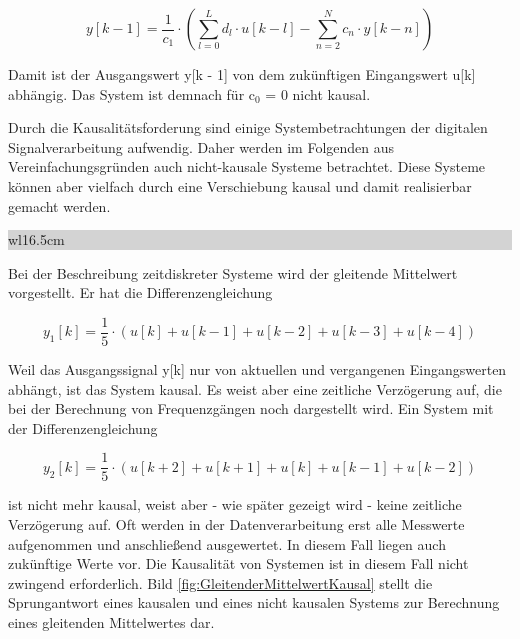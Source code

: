 \begin{equation}\label{eq:fourthirtyeight}
y\left[k-1\right]=\frac{1}{c_{1} } \cdot \left(\sum _{l=0}^{L}d_{l} \cdot u\left[k-l\right] -\sum _{n=2}^{N}c_{n} \cdot y\left[k-n\right] \right)
\end{equation}

\noindent Damit ist der Ausgangswert y[k - 1] von dem zuk\"{u}nftigen Eingangswert u[k] abh\"{a}ngig. Das System ist demnach f\"{u}r c${}_{0}$ = 0 nicht kausal.\bigskip 

\noindent Durch die Kausalit\"{a}tsforderung sind einige Systembetrachtungen der digitalen Signalverarbeitung aufwendig. Daher werden im Folgenden aus Vereinfachungsgr\"{u}nden auch nicht-kausale Systeme betrachtet. Diese Systeme k\"{o}nnen aber vielfach durch eine Verschiebung kausal und damit realisierbar gemacht werden.\bigskip

\noindent
\colorbox{lightgray}{%
%
\renewcommand\arraystretch{0.6}%
\begin{tabular}{ wl{16.5cm} }
{}
\end{tabular}%
}\medskip

\noindent Bei der Beschreibung zeitdiskreter Systeme wird der gleitende Mittelwert vorgestellt. Er hat die Differenzengleichung 

\begin{equation}\label{eq:fourthirtynine}
y_{1} \left[k\right]=\frac{1}{5} \cdot \left(u\left[k\right]+u\left[k-1\right]+u\left[k-2\right]+u\left[k-3\right]+u\left[k-4\right]\right)
\end{equation}

\noindent Weil das Ausgangssignal y[k] nur von aktuellen und vergangenen Eingangswerten abh\"{a}ngt, ist das System kausal. Es weist aber eine zeitliche Verz\"{o}gerung auf, die bei der Berechnung von Frequenzg\"{a}ngen noch dargestellt wird. Ein System mit der Differenzengleichung

\begin{equation}\label{eq:fourfourty}
y_{2} \left[k\right]=\frac{1}{5} \cdot \left(u\left[k+2\right]+u\left[k+1\right]+u\left[k\right]+u\left[k-1\right]+u\left[k-2\right]\right)
\end{equation}

\noindent ist nicht mehr kausal, weist aber - wie sp\"{a}ter gezeigt wird - keine zeitliche Verz\"{o}gerung auf. Oft werden in der Datenverarbeitung erst alle Messwerte aufgenommen und anschlie{\ss}end ausgewertet. In diesem Fall liegen auch zuk\"{u}nftige Werte vor. Die Kausalit\"{a}t von Systemen ist in diesem Fall nicht zwingend erforderlich. Bild \ref{fig:GleitenderMittelwertKausal} stellt die Sprungantwort eines kausalen und eines nicht kausalen Systems zur Berechnung eines gleitenden Mittelwertes dar.

